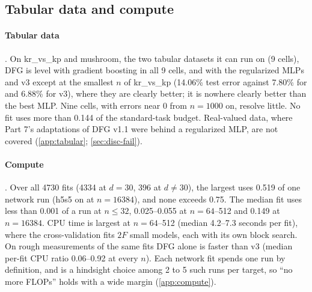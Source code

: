 \subsection{Tabular data and compute}\label{sec:res-tabular}\label{sec:res-compute}

\paragraph{Tabular data} . On kr\_vs\_kp and mushroom, the two tabular datasets it can run on (9 cells), DFG is level with gradient boosting in all 9 cells, and with the regularized MLPs and v3 except at the smallest $n$ of kr\_vs\_kp (14.06\% test error against 7.80\% for  and 6.88\% for v3), where they are clearly better; it is nowhere clearly better than the best MLP. Nine cells, with errors near 0 from $n=1000$ on, resolve little. No fit uses more than 0.144 of the standard-task budget. Real-valued data, where Part 7's adaptations of DFG v1.1 were behind a regularized MLP, are not covered (\cref{app:tabular}; \cref{sec:disc-fail}).

\paragraph{Compute} . Over all 4730 fits (4334 at $d=30$, 396 at $d\ne30$), the largest uses 0.519 of one network run (h5s5 on  at $n=16384$), and none exceeds 0.75. The median fit uses less than 0.001 of a run at $n\le32$, 0.025--0.055 at $n=64$--512 and 0.149 at $n=16384$. CPU time is largest at $n=64$--512 (median 4.2--7.3 seconds per fit), where the cross-validation fits $2F$ small models, each with its own block search. On rough measurements of the same fits DFG alone is faster than v3 (median per-fit CPU ratio 0.06--0.92 at every $n$). Each network fit spends one run by definition, and  is a hindsight choice among 2 to 5 such runs per target, so ``no more FLOPs'' holds with a wide margin (\cref{app:compute}).

